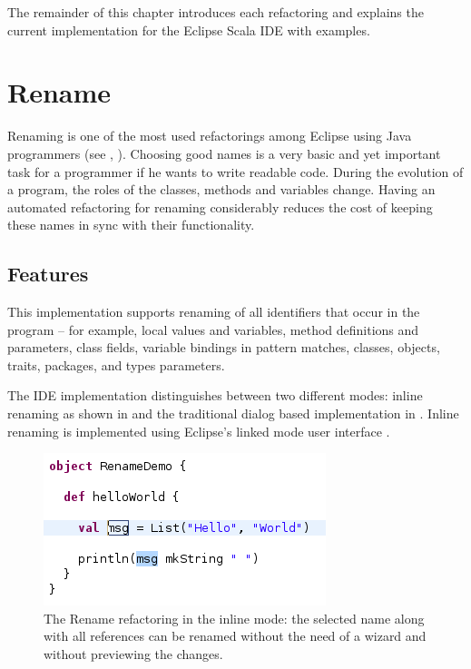 \documentclass[10pt,a4paper,oneside]{scrreprt}
\begin{document}
The remainder of this chapter introduces each refactoring and explains the current implementation for the Eclipse Scala IDE with examples. 

\section{Rename}

Renaming is one of the most used refactorings among Eclipse using Java programmers (see \cite{RefactoringStudy}, \cite{RefactoringInEclipse}). Choosing good names is a very basic and yet important task for a programmer if he wants to write readable code. During the evolution of a program, the roles of the classes, methods and variables change. Having an automated refactoring for renaming considerably reduces the cost of keeping these names in sync with their functionality.

\subsection{Features}

This implementation supports renaming of all identifiers that occur in the program -- for example, local values and variables, method definitions and parameters, class fields, variable bindings in pattern matches, classes, objects, traits, packages, and types parameters.

The IDE implementation distinguishes between two different modes: inline renaming as shown in  and the traditional dialog based implementation in . Inline renaming is implemented using Eclipse's linked mode user interface \cite{LinkedUI}.

\begin{figure}
  \centering
  \includegraphics[width=0.5\linewidth]{rename_screenshot_1.png}
  \caption{The Rename refactoring in the inline mode: the selected name along with all references can be renamed without the need of a wizard and without previewing the changes.}
  \label{figure:rename-screenshot-1}
\end{figure}
\end{document}
